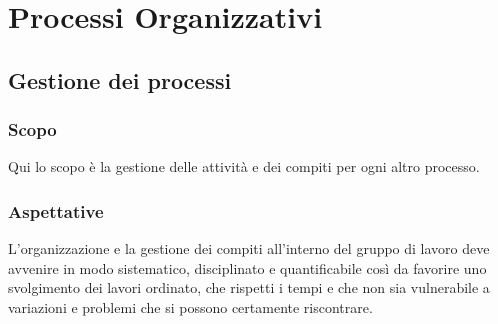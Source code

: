 \section{Processi Organizzativi}
\label{organizzativi}


\subsection{Gestione dei processi}
    \subsubsection{Scopo}
    Qui lo scopo è la gestione delle attività e dei compiti per ogni altro processo.
    \subsubsection{Aspettative}
    L'organizzazione e la gestione dei compiti all'interno del gruppo di lavoro deve avvenire in modo sistematico, disciplinato e quantificabile così da favorire uno svolgimento dei lavori ordinato, che rispetti i tempi e che non sia vulnerabile a variazioni e problemi che si possono certamente riscontrare.
